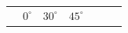 {{    \addtocounter{footnote}{-0}
    
          }{ %
        
    
        \begin{center}
      
      \label{m39408*id80733}
      
    \noindent
      \tablelasttail{}
      \begin{xtabular}[t]{|l|l|l|l|l|l|l|}\hline
    
    
         &
    
    
        
                \begin{math}{0}^{\circ }\end{math}
               &
    
    
        
                \begin{math}{30}^{\circ }\end{math}
               &
    
    
        
                \begin{math}{45}^{\circ }\end{math}
               &
    
    
        

\end{xtabular}
\end{center}}}
